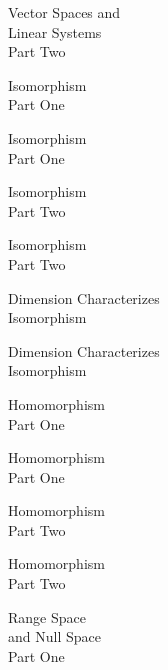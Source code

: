 \documentclass{titlescreen}
\begin{document}
\begin{videotitle}
  Vector Spaces and \\[0.5ex]
  Linear Systems \\[1ex]
  Part Two 
\end{videotitle}
\begin{videoend}
  Isomorphism \\[1ex]
  Part One
\end{videoend}





\begin{videotitle}
  Isomorphism  \\[1ex]
  Part One
\end{videotitle}
\begin{videoend}
  Isomorphism \\[1ex]
  Part Two 
\end{videoend}

% 
\begin{videotitle}
  Isomorphism  \\[1ex]
  Part Two
\end{videotitle}
\begin{videoend}
  Dimension Characterizes \\[0.5ex]
  Isomorphism
\end{videoend}

\begin{videotitle}
  Dimension Characterizes \\[0.5ex]
  Isomorphism
\end{videotitle}
\begin{videoend}
  Homomorphism  \\[1ex]
  Part One
\end{videoend}

\begin{videotitle}
  Homomorphism  \\[1ex]
  Part One
\end{videotitle}
\begin{videoend}
  Homomorphism  \\[1ex]
  Part Two
\end{videoend}

%
\begin{videotitle}
  Homomorphism  \\[1ex]
  Part Two
\end{videotitle}
\begin{videoend}
  Range Space  \\[0.5ex]
  and Null Space  \\[1ex]
  Part One
\end{videoend}
\end{document}

